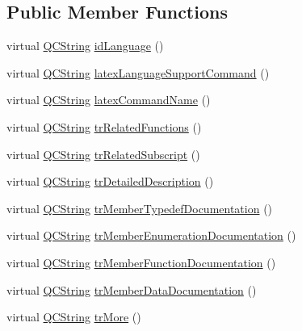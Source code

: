\subsection*{Public Member Functions}
\begin{DoxyCompactItemize}
\item 
virtual \mbox{\hyperlink{class_q_c_string}{Q\+C\+String}} \mbox{\hyperlink{class_translator_korean_aa41f60e69b2c9cb5873fa7aff1625a49}{id\+Language}} ()
\item 
virtual \mbox{\hyperlink{class_q_c_string}{Q\+C\+String}} \mbox{\hyperlink{class_translator_korean_aca14550a63c96a39db1c703bc834c766}{latex\+Language\+Support\+Command}} ()
\item 
virtual \mbox{\hyperlink{class_q_c_string}{Q\+C\+String}} \mbox{\hyperlink{class_translator_korean_af309b5d610ebe93451744e88db8a0f20}{latex\+Command\+Name}} ()
\item 
virtual \mbox{\hyperlink{class_q_c_string}{Q\+C\+String}} \mbox{\hyperlink{class_translator_korean_ae9fa94f5a3ef46d1e824f7c6e804dfad}{tr\+Related\+Functions}} ()
\item 
virtual \mbox{\hyperlink{class_q_c_string}{Q\+C\+String}} \mbox{\hyperlink{class_translator_korean_aa90bf0e4a7bb5c89cde511affbb65126}{tr\+Related\+Subscript}} ()
\item 
virtual \mbox{\hyperlink{class_q_c_string}{Q\+C\+String}} \mbox{\hyperlink{class_translator_korean_a363daf2b9ae9fa4719ffc0194b23872c}{tr\+Detailed\+Description}} ()
\item 
virtual \mbox{\hyperlink{class_q_c_string}{Q\+C\+String}} \mbox{\hyperlink{class_translator_korean_a403e4a3b1720e6c420386296d72260aa}{tr\+Member\+Typedef\+Documentation}} ()
\item 
virtual \mbox{\hyperlink{class_q_c_string}{Q\+C\+String}} \mbox{\hyperlink{class_translator_korean_a92809a89f37f709fa100b7723daff4f8}{tr\+Member\+Enumeration\+Documentation}} ()
\item 
virtual \mbox{\hyperlink{class_q_c_string}{Q\+C\+String}} \mbox{\hyperlink{class_translator_korean_aa4b7b176cd22329c6b32b1451d421187}{tr\+Member\+Function\+Documentation}} ()
\item 
virtual \mbox{\hyperlink{class_q_c_string}{Q\+C\+String}} \mbox{\hyperlink{class_translator_korean_acf6f5ef874132851f5c4aee0e1ebbea8}{tr\+Member\+Data\+Documentation}} ()
\item 
virtual \mbox{\hyperlink{class_q_c_string}{Q\+C\+String}} \mbox{\hyperlink{class_translator_korean_a076b041b290add4061aec5b517fa4282}{tr\+More}} ()

\end{DoxyCompactItemize}

